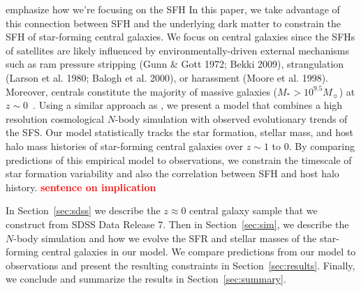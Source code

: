 \documentclass[12pt, letterpaper, preprint, tighten]{aastex62}
\newcommand{\todo}[1]{{\bf \textcolor{red}{#1}}}
\newcommand{\ch}[1]{\color{orange}{\bf CH:} #1}
\begin{document}
{\ch emphasize how we're focusing on the SFH} 
In this paper, we take advantage of this connection between SFH and 
the underlying dark matter to constrain the SFH of star-forming central 
galaxies. We focus on central galaxies since the SFHs of satellites 
are likely influenced by environmentally-driven external mechanisms 
such as ram pressure stripping (Gunn \& Gott 1972; Bekki 2009), 
strangulation (Larson et al. 1980; Balogh et al. 2000), or 
harassment (Moore et al. 1998). Moreover, centrals constitute the 
majority of massive galaxies ($M_*>10^{9.5}M_\sun$) at 
$z\sim0$~\citep{wetzel2013}. Using a similar approach as \cite{wetzel2013, hahn2017}, 
we present a model that combines a high resolution cosmological 
$N$-body simulation with observed evolutionary trends of the SFS. 
Our model statistically tracks the star formation, stellar mass, 
and host halo mass histories of star-forming central galaxies over 
$z\sim1$ to $0$. By comparing predictions of this empirical 
model to observations, we constrain the timescale of star formation 
variability and also the correlation between SFH and host halo history.  
\todo{sentence on implication}

In Section~\ref{sec:sdss} we describe the $z\approx0$ central galaxy 
sample that we construct from SDSS Data Release 7. Then in 
Section~\ref{sec:sim}, we describe the $N$-body simulation and how we
evolve the SFR and stellar masses of the star-forming central galaxies 
in our model. We compare predictions from our model to observations 
and present the resulting constraints in Section~\ref{sec:results}. 
Finally, we conclude and summarize the results in 
Section~\ref{sec:summary}.
\end{document}
